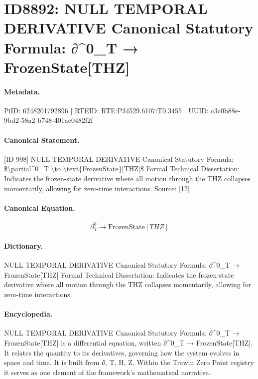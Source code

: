 \section*{ID8892: NULL TEMPORAL DERIVATIVE Canonical Statutory Formula: ∂\textasciicircum{}0\_T → FrozenState[THZ]}
\paragraph{Metadata.}
PiID: 6248201792896 | RTEID: RTE:P34529.6107:T0.3455 | UUID: c3c0b88e-9bd2-58a2-b748-401ae0482f2f

\paragraph{Canonical Statement.}
[ID 998] NULL TEMPORAL DERIVATIVE Canonical Statutory Formula: \$\textbackslash{}partial\textasciicircum{}0\_T \textbackslash{}to \textbackslash{}text\{FrozenState\}[THZ]\$ Formal Technical Dissertation: Indicates the frozen-state derivative where all motion through the THZ collapses momentarily, allowing for zero-time interactions. Source: [12]

\paragraph{Canonical Equation.}
\[
\partial^0_T \to \text{FrozenState}[THZ]
\]

\paragraph{Dictionary.}
NULL TEMPORAL DERIVATIVE Canonical Statutory Formula: ∂\textasciicircum{}0\_T → FrozenState[THZ] Formal Technical Dissertation: Indicates the frozen-state derivative where all motion through the THZ collapses momentarily, allowing for zero-time interactions.

\paragraph{Encyclopedia.}
NULL TEMPORAL DERIVATIVE Canonical Statutory Formula: ∂\textasciicircum{}0\_T → FrozenState[THZ] is a differential equation, written ∂\textasciicircum{}0\_T → FrozenState[THZ]. It relates the quantity to its derivatives, governing how the system evolves in space and time. It is built from ∂, T, H, Z. Within the Trawin Zero Point registry it serves as one element of the framework's mathematical narrative.
